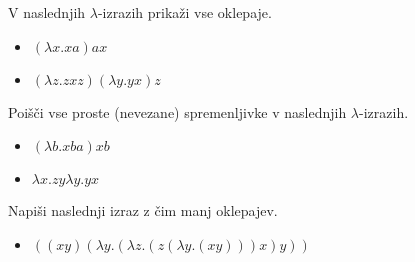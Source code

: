 \begin{ex}
V naslednjih $\lambda$-izrazih prika\v zi vse oklepaje.  
\begin{itemize}
\item $(\lambda x.xa)ax$ 
\item $(\lambda z.zxz)(\lambda y.yx)z$ 
\end{itemize}
\end{ex}




\begin{ex}
Poi\v s\v ci vse proste (nevezane) spremenljivke v naslednjih $\lambda$-izrazih. 
\begin{itemize}
\item $(\lambda b.xba)xb$ 
\item $\lambda x.zy\lambda y.yx $
\end{itemize}
\end{ex}



\begin{ex}
Napi\v si naslednji izraz z \v cim manj oklepajev. 

 \begin{itemize}
 \item $((xy)(\lambda y.(\lambda z.(z(\lambda y.(xy)))x)y)) $
 \end{itemize}
\end{ex} 

